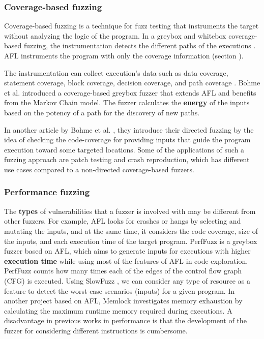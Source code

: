 \subsubsection{Coverage-based fuzzing}

Coverage-based fuzzing is a technique for fuzz testing that instruments the target without analyzing the logic of the program. In a greybox and whitebox coverage-based fuzzing, the instrumentation detects the different paths of the executions \cite{liang2018fuzzing}. AFL instruments the program with only the coverage information (section ).

The instrumentation can collect execution's data such as data coverage, statement coverage, block coverage, decision coverage, and path coverage \cite{yang2009survey}. Bohme et al. \cite{bohme2017coverage} introduced a coverage-based greybox fuzzer that extends AFL and benefits from the Markov Chain model. The fuzzer calculates the \textbf{energy} of the inputs based on the potency of a path for the discovery of new paths.

In another article by Bohme et al. \cite{bohme2017directed}, they introduce their directed fuzzing by the idea of checking the code-coverage for providing inputs that guide the program execution toward some targeted locations. Some of the applications of such a fuzzing approach are patch testing and crash reproduction, which has different use cases compared to a non-directed coverage-based fuzzers.

\subsubsection{Performance fuzzing}

The \textbf{types} of vulnerabilities that a fuzzer is involved with may be different from other fuzzers. For example, AFL looks for crashes or hangs by selecting and mutating the inputs, and at the same time, it considers the code coverage, size of the inputs, and each execution time of the target program. PerfFuzz \cite{lemieux2018perffuzz} is a greybox fuzzer based on AFL, which aims to generate inputs for executions with higher \textbf{execution time} while using most of the features of AFL in code exploration. PerfFuzz counts how many times each of the edges of the control flow graph (CFG) is executed. Using SlowFuzz \cite{petsios2017slowfuzz}, we can consider any type of resource as a feature to detect the worst-case scenarios (inputs) for a given program. In another project based on AFL, Memlock \cite{wen2020memlock} investigates memory exhaustion by calculating the maximum runtime memory required during executions. A disadvantage in previous works in performance is that the development of the fuzzer for considering different instructions is cumbersome.

